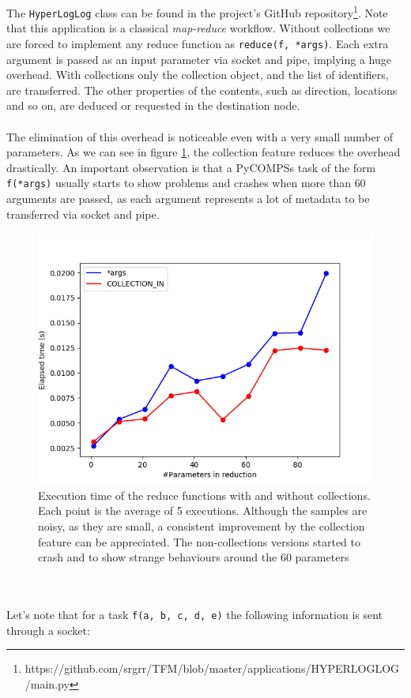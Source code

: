 \newpage
\inputminted{python}{applications/HYPERLOGLOG/main.py}
The \verb|HyperLogLog| class can be found in the project's GitHub repository\footnote{https://github.com/srgrr/TFM/blob/master/applications/HYPERLOGLOG/main.py}.
Note that this application is a classical \textit{map-reduce} workflow. Without collections we are forced to implement any reduce function as \verb|reduce(f, *args)|. Each extra argument is passed as an input parameter via socket and pipe, implying a huge overhead. With collections only the collection object, and the list of identifiers, are transferred. The other properties of the contents, such as direction, locations and so on, are deduced or requested in the destination node.\\
\\
The elimination of this overhead is noticeable even with a very small number of parameters. As we can see in figure \ref{fig:collection_vs_normal}, the collection feature reduces the overhead drastically. An important observation is that a PyCOMPSs task of the form \verb|f(*args)| usually starts to show problems and crashes when more than $60$ arguments are passed, as each argument represents a lot of metadata to be transferred via socket and pipe.
\begin{figure}[ht!]
\centering
\includegraphics[scale = 0.5]{figures/collection_vs_normal.png}
\caption{Execution time of the reduce functions with and without collections. Each point is the average of 5 executions. Although the samples are noisy, as they are small, a consistent improvement by the collection feature can be appreciated. The non-collections versions started to crash and to show strange behaviours around the 60 parameters}
\label{fig:collection_vs_normal}
\end{figure}\\
\\
Let's note that for a task \verb|f(a, b, c, d, e)| the following information is sent through a socket:

